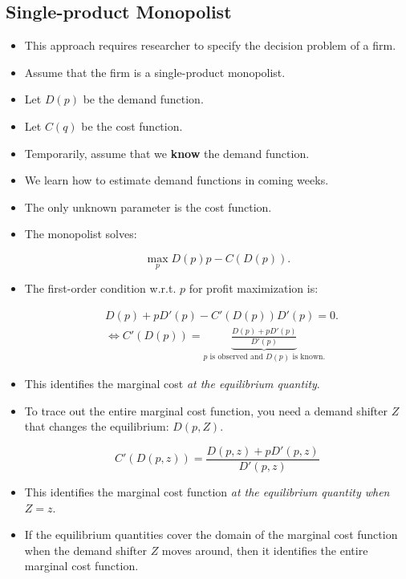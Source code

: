 \documentclass[]{book}
\begin{document}
\subsection{Single-product Monopolist}\label{single-product-monopolist}

\begin{itemize}
\item
  This approach requires researcher to specify the decision problem of a
  firm.
\item
  Assume that the firm is a single-product monopolist.
\item
  Let \(D(p)\) be the demand function.
\item
  Let \(C(q)\) be the cost function.
\item
  Temporarily, assume that we \textbf{know} the demand function.
\item
  We learn how to estimate demand functions in coming weeks.
\item
  The only unknown parameter is the cost function.
\item
  The monopolist solves:

  \begin{equation}
  \max_{p} D(p)p - C(D(p)).
  \end{equation}
\item
  The first-order condition w.r.t. \(p\) for profit maximization is:

  \begin{equation}
  \begin{split}
  &D(p) + pD'(p) - C'(D(p)) D'(p) = 0.\\
  &\Leftrightarrow C'(D(p)) = \underbrace{\frac{D(p) + pD'(p)}{D'(p)}}_{\text{$p$ is observed and $D(p)$ is known.}}
  \end{split}
  \end{equation}
\item
  This identifies the marginal cost
  \textit{at the equilibrium quantity}.
\item
  To trace out the entire marginal cost function, you need a demand
  shifter \(Z\) that changes the equilibrium: \(D(p, Z)\).

  \begin{equation}
  C'(D(p, z)) = \frac{D(p, z) + pD'(p, z)}{D'(p, z)}
  \end{equation}
\item
  This identifies the marginal cost function
  \textit{at the equilibrium quantity when $Z = z$}.
\item
  If the equilibrium quantities cover the domain of the marginal cost
  function when the demand shifter \(Z\) moves around, then it
  identifies the entire marginal cost function.
\end{itemize}
\end{document}
